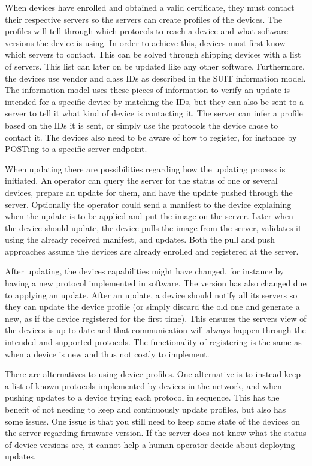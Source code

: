 \documentclass[0-thesis.tex]{subfiles}
\begin{document}
When devices have enrolled and obtained a valid certificate, they must contact their
respective servers so the servers can create profiles of the devices. The profiles will
tell through which protocols to reach a device and what software versions the device is
using. In order to achieve this, devices must first know which servers to contact. This
can be solved through shipping devices with a list of servers. This list can later on be
updated like any other software. Furthermore, the devices use vendor and class IDs as
described in the SUIT information model. The information model uses these pieces of
information to verify an update is intended for a specific device by matching the IDs, but
they can also be sent to a server to tell it what kind of device is contacting it. The
server can infer a profile based on the IDs it is sent, or simply use the protocols the
device chose to contact it. The devices also need to be aware of how to register, for
instance by POSTing to a specific server endpoint. 

When updating there are possibilities regarding how the updating process is initiated. An
operator can query the server for the status of one or several devices, prepare an update
for them, and have the update pushed through the server. Optionally the operator could
send a manifest to the device explaining when the update is to be applied and put the
image on the server. Later when the device should update, the device pulls the image from
the server, validates it using the already received manifest, and updates. Both the pull
and push approaches assume the devices are already enrolled and registered at the server.

After updating, the devices capabilities might have changed, for instance by having a new
protocol implemented in software. The version has also changed due to applying an update.
After an update, a device should notify all its servers so they can update the device
profile (or simply discard the old one and generate a new, as if the device registered for
the first time). This ensures the servers view of the devices is up to date and that
communication will always happen through the intended and supported protocols. The
functionality of registering is the same as when a device is new and thus not costly to
implement.

There are alternatives to using device profiles. One alternative is to instead keep a list
of known protocols implemented by devices in the network, and when pushing updates to a
device trying each protocol in sequence. This has the benefit of not needing to keep and
continuously update profiles, but also has some issues. One issue is that you still need
to keep some state of the devices on the server regarding firmware version. If the server
does not know what the status of device versions are, it cannot help a human operator
decide about deploying updates. 
\end{document}
